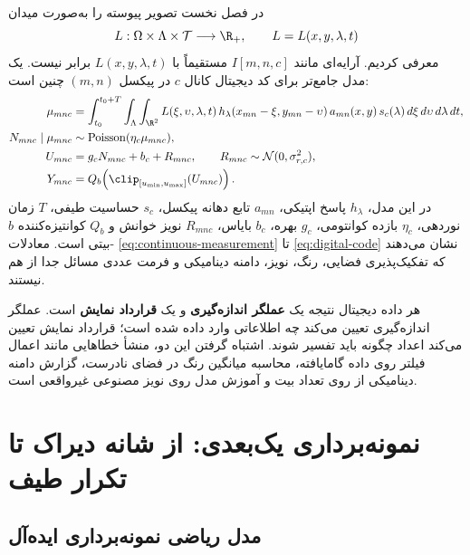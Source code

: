 در فصل نخست تصویر پیوسته را به‌صورت میدان
\begin{equation}
L:\Omega\times\Lambda\times\mathcal T\longrightarrow\R_{+},
\qquad L=L(x,y,\lambda,t)
\end{equation}
معرفی کردیم. آرایه‌ای مانند \(I[m,n,c]\) مستقیماً با \(L(x,y,\lambda,t)\) برابر نیست.
یک مدل جامع‌تر برای کد دیجیتال کانال \(c\) در پیکسل \((m,n)\) چنین است:
\begin{align}
\mu_{mnc}
&=\int_{t_0}^{t_0+T}\int_{\Lambda}\int_{\R^2}
L(\xi,\upsilon,\lambda,t)\,
 h_{\lambda}(x_{mn}-\xi,y_{mn}-\upsilon)\,
 a_{mn}(x,y)\,s_c(\lambda)
\,d\xi\,d\upsilon\,d\lambda\,dt,\label{eq:continuous-measurement}\\
N_{mnc}\mid\mu_{mnc}&\sim\operatorname{Poisson}(\eta_c\mu_{mnc}),\label{eq:poisson-electrons}\\
U_{mnc}&=g_cN_{mnc}+b_c+R_{mnc},\qquad R_{mnc}\sim\mathcal N(0,\sigma_{r,c}^{2}),\label{eq:analog-sensor}\\
Y_{mnc}&=Q_b\!\left(\clip_{[u_{\min},u_{\max}]}(U_{mnc})\right).
\label{eq:digital-code}
\end{align}
در این مدل، \(h_\lambda\) پاسخ اپتیکی، \(a_{mn}\) تابع دهانه پیکسل، \(s_c\) حساسیت طیفی،
\(T\) زمان نوردهی، \(\eta_c\) بازده کوانتومی، \(g_c\) بهره، \(b_c\) بایاس،
\(R_{mnc}\) نویز خوانش و \(Q_b\) کوانتیزه‌کننده \(b\)-بیتی است.
معادلات \eqref{eq:continuous-measurement} تا \eqref{eq:digital-code} نشان می‌دهند که
تفکیک‌پذیری فضایی، رنگ، نویز، دامنه دینامیکی و فرمت عددی مسائل جدا از هم نیستند.

\begin{keybox}
هر داده دیجیتال نتیجه یک \textbf{عملگر اندازه‌گیری} و یک \textbf{قرارداد نمایش} است.
عملگر اندازه‌گیری تعیین می‌کند چه اطلاعاتی وارد داده شده است؛ قرارداد نمایش تعیین می‌کند
اعداد چگونه باید تفسیر شوند. اشتباه گرفتن این دو، منشأ خطاهایی مانند اعمال فیلتر روی داده
گامایافته، محاسبه میانگین رنگ در فضای نادرست، گزارش دامنه دینامیکی از روی تعداد بیت و
آموزش مدل روی نویز مصنوعی غیرواقعی است.
\end{keybox}

\section{نمونه‌برداری یک‌بعدی: از شانه دیراک تا تکرار طیف}

\subsection{مدل ریاضی نمونه‌برداری ایده‌آل}

